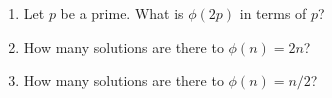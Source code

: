   \begin{enumerate}[nosep,label=\textnormal{(\alph*)}]
  \item  Let $p$ be a prime. What is $\phi(2p)$ in terms of $p$?
  \item  How many solutions are there to $\phi(n) = 2n$?
  \item  How many solutions are there to $\phi(n) = n/2$?    
  \end{enumerate}
